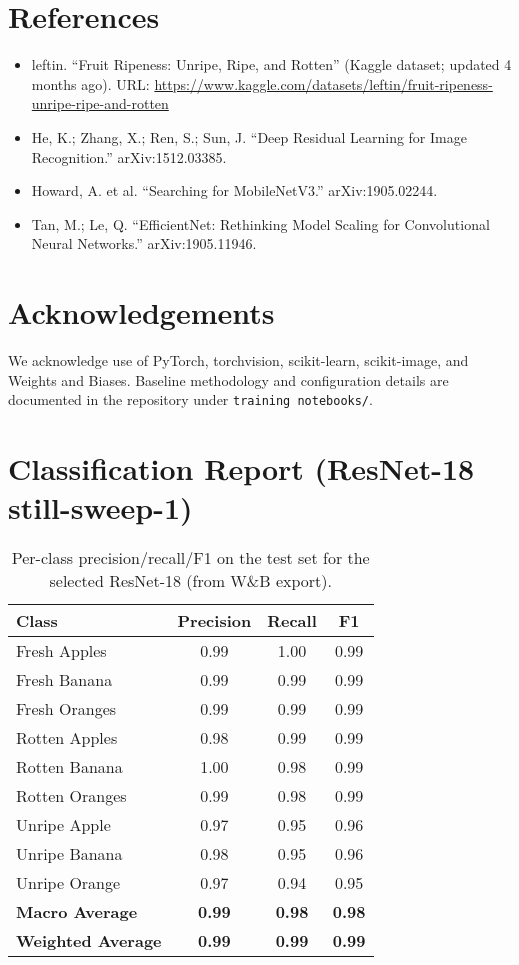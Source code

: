 \documentclass[11pt,a4paper]{article}
\begin{document}
\section*{References}
\begin{itemize}
  \item leftin. ``Fruit Ripeness: Unripe, Ripe, and Rotten'' (Kaggle dataset; updated 4 months ago). URL: \href{https://www.kaggle.com/datasets/leftin/fruit-ripeness-unripe-ripe-and-rotten}{https://www.kaggle.com/datasets/leftin/fruit-ripeness-unripe-ripe-and-rotten}
  \item He, K.; Zhang, X.; Ren, S.; Sun, J. ``Deep Residual Learning for Image Recognition.'' arXiv:1512.03385.
  \item Howard, A. et al. ``Searching for MobileNetV3.'' arXiv:1905.02244.
  \item Tan, M.; Le, Q. ``EfficientNet: Rethinking Model Scaling for Convolutional Neural Networks.'' arXiv:1905.11946.
\end{itemize}

\section*{Acknowledgements}
We acknowledge use of PyTorch, torchvision, scikit-learn, scikit-image, and Weights and Biases. Baseline methodology and configuration details are documented in the repository under \texttt{training notebooks/}.

\newpage
\appendix
\section{Classification Report (ResNet-18 still-sweep-1)}
\begin{table}[h]
\centering
\caption{Per-class precision/recall/F1 on the test set for the selected ResNet-18 (from W\&B export).}
\label{tab:classification-report}
\begin{tabular}{lccc}
\hline
\textbf{Class} & \textbf{Precision} & \textbf{Recall} & \textbf{F1} \\
\hline
Fresh Apples & 0.99 & 1.00 & 0.99 \\
Fresh Banana & 0.99 & 0.99 & 0.99 \\
Fresh Oranges & 0.99 & 0.99 & 0.99 \\
Rotten Apples & 0.98 & 0.99 & 0.99 \\
Rotten Banana & 1.00 & 0.98 & 0.99 \\
Rotten Oranges & 0.99 & 0.98 & 0.99 \\
Unripe Apple & 0.97 & 0.95 & 0.96 \\
Unripe Banana & 0.98 & 0.95 & 0.96 \\
Unripe Orange & 0.97 & 0.94 & 0.95 \\
\hline
\textbf{Macro Average} & \textbf{0.99} & \textbf{0.98} & \textbf{0.98} \\
\textbf{Weighted Average} & \textbf{0.99} & \textbf{0.99} & \textbf{0.99} \\
\hline
\end{tabular}
\end{table}
\end{document}
